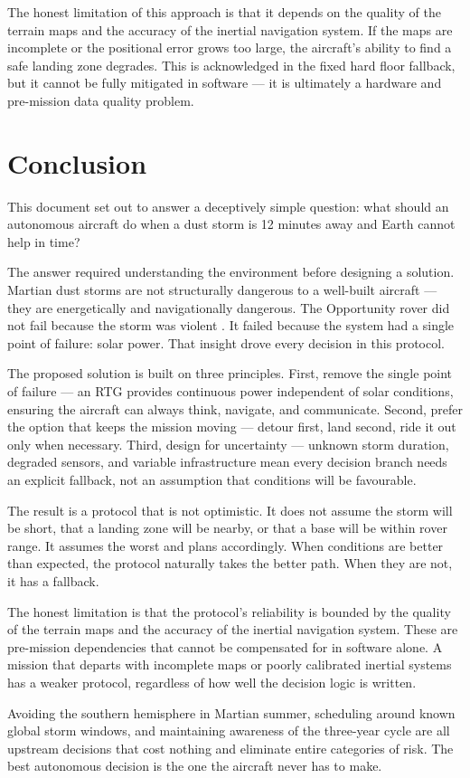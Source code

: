 \documentclass[a4paper,12pt]{article}
\begin{document}
The honest limitation of this approach is that it depends on the quality of the terrain maps
and the accuracy of the inertial navigation system. If the maps are incomplete or the
positional error grows too large, the aircraft's ability to find a safe landing zone degrades.
This is acknowledged in the fixed hard floor fallback, but it cannot be fully mitigated in
software — it is ultimately a hardware and pre-mission data quality problem.

\section{Conclusion}
This document set out to answer a deceptively simple question: what should an autonomous
aircraft do when a dust storm is 12 minutes away and Earth cannot help in time?

The answer required understanding the environment before designing a solution. Martian dust
storms are not structurally dangerous to a well-built aircraft — they are energetically and
navigationally dangerous. The Opportunity rover did not fail because the storm was violent \cite{nasa_opportunity}.
It failed because the system had a single point of failure: solar power. That insight drove
every decision in this protocol.

The proposed solution is built on three principles. First, remove the single point of failure
— an RTG \cite{nasa_mmrtg} provides continuous power independent of solar conditions, ensuring the aircraft can
always think, navigate, and communicate. Second, prefer the option that keeps the mission
moving — detour first, land second, ride it out only when necessary. Third, design for
uncertainty — unknown storm duration, degraded sensors, and variable infrastructure mean
every decision branch needs an explicit fallback, not an assumption that conditions will
be favourable.

The result is a protocol that is not optimistic. It does not assume the storm will be short,
that a landing zone will be nearby, or that a base will be within rover range. It assumes the
worst and plans accordingly. When conditions are better than expected, the protocol naturally
takes the better path. When they are not, it has a fallback.

The honest limitation is that the protocol's reliability is bounded by the quality of the
terrain maps and the accuracy of the inertial navigation system. These are pre-mission
dependencies that cannot be compensated for in software alone. A mission that departs with
incomplete maps or poorly calibrated inertial systems has a weaker protocol, regardless of
how well the decision logic is written.

Avoiding the southern hemisphere in Martian summer, scheduling around known global storm windows,
and maintaining awareness of the three-year cycle are all upstream decisions that cost nothing
and eliminate entire categories of risk. The best autonomous decision is the one the aircraft
never has to make.

\newpage


\end{document}
